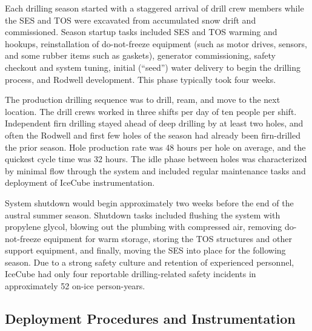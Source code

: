 Each drilling season started with a staggered arrival of drill crew members
while the SES and TOS were excavated from accumulated snow drift and commissioned.  Season startup
tasks included SES and TOS warming and hookups, reinstallation of
do-not-freeze equipment (such as motor drives, sensors, and some
rubber items such as gaskets), generator commissioning, safety checkout and system
tuning, initial (``seed'') water delivery to begin the drilling process, and Rodwell development.  This phase typically
took four weeks.

The production drilling sequence was to drill, ream, and move to the next
location. The drill crews worked in three shifts per day of ten people
per shift. Independent firn drilling stayed ahead of deep drilling by at
least two holes, and often the Rodwell and first few holes of
the season had already been firn-drilled the prior season. Hole production rate was 48 hours per hole on average,
and the quickest cycle time was 32 hours. The idle phase
between holes was characterized by minimal flow through the
system and included regular maintenance tasks and deployment of IceCube
instrumentation.  

System shutdown would begin approximately two weeks before the end of the
austral summer season. Shutdown tasks included flushing the system with
propylene glycol, blowing out the plumbing with compressed air, removing
do-not-freeze equipment for warm storage, storing the TOS structures and
other support equipment, and finally, moving the SES into place for the
following season.  Due to a strong safety culture and retention of
experienced personnel, IceCube had only
four reportable drilling-related safety incidents in approximately 52 on-ice 
person-years. 

\subsection{\label{sec:deployment_inst}Deployment Procedures and Instrumentation}

